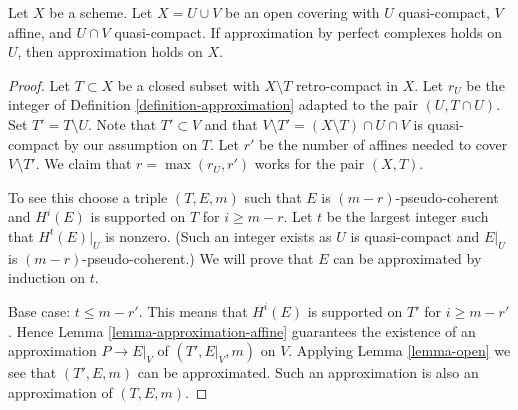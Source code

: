 \begin{lemma}
\label{lemma-induction-step}
Let $X$ be a scheme. Let $X = U \cup V$ be an open covering
with $U$ quasi-compact, $V$ affine, and $U \cap V$ quasi-compact.
If approximation by perfect complexes holds on $U$,
then approximation holds on $X$.
\end{lemma}

\begin{proof}
Let $T \subset X$ be a closed subset with $X \setminus T$ retro-compact
in $X$. Let $r_U$ be the integer of Definition \ref{definition-approximation}
adapted to the pair $(U, T \cap U)$.
Set $T' = T \setminus U$. Note that
$T' \subset V$ and that $V \setminus T' = (X \setminus T) \cap U \cap V$
is quasi-compact by our assumption on $T$.
Let $r'$ be the number of affines needed to cover $V \setminus T'$.
We claim that $r = \max(r_U, r')$ works for the pair $(X, T)$.

\medskip\noindent
To see this choose a triple $(T, E, m)$ such that $E$ is
$(m - r)$-pseudo-coherent and $H^i(E)$ is supported on $T$ for
$i \geq m - r$. Let $t$ be the largest integer such that
$H^t(E)|_U$ is nonzero. (Such an integer exists as $U$ is quasi-compact
and $E|_U$ is $(m - r)$-pseudo-coherent.)
We will prove that $E$ can be approximated by induction on $t$.

\medskip\noindent
Base case: $t \leq m - r'$. This means that $H^i(E)$ is supported
on $T'$ for $i \geq m - r'$. Hence
Lemma \ref{lemma-approximation-affine}
guarantees the existence of an approximation
$P \to E|_V$ of $(T', E|_V, m)$ on $V$.
Applying Lemma \ref{lemma-open} we see that
$(T', E, m)$ can be approximated. Such an approximation
is also an approximation of $(T, E, m)$.


\end{proof}
